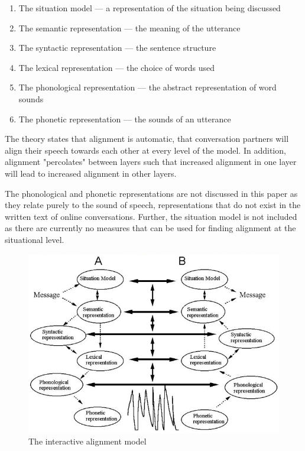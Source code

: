 \documentclass[conference]{IEEEtran}
\begin{document}
\begin{enumerate}
	\item The situation model --- a representation of the situation being discussed
	\item The semantic representation --- the meaning of the utterance
	\item The syntactic representation --- the sentence structure
	\item The lexical representation --- the choice of words used
	\item The phonological representation --- the abstract representation of word sounds
	\item The phonetic representation --- the sounds of an utterance
\end{enumerate}

The theory states that alignment is automatic, that conversation partners will align their speech  towards each other at every level of the model. In addition, alignment "percolates" between layers such that increased alignment in one layer will lead to increased alignment in other layers.

The phonological and phonetic representations are not discussed in this paper as they relate purely to the sound of speech, representations that do not exist in the written text of online conversations. Further, the situation model is not included as there are currently no measures that can be used for finding alignment at the situational level.

\begin{figure}
\caption{The interactive alignment model}
\label{iam}
\includegraphics[width=\textwidth]{iam}
\end{figure}
\end{document}
